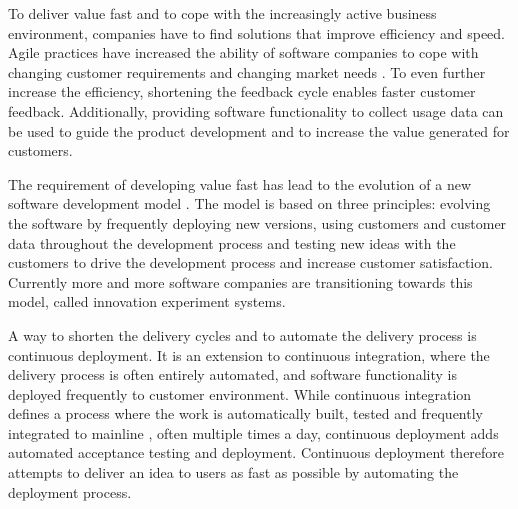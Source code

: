 \documentclass[english]{tktltiki2}
\theoremstyle{definition}
\theoremstyle{remark}
\begin{document}
To deliver value fast and to cope with the increasingly active business environment, companies have to find solutions that improve efficiency and speed. Agile practices \cite{cockburn2002agile} have increased the ability of software companies to cope with changing customer requirements and changing market needs \cite{dzamashvili2010impact}. To even further increase the efficiency, shortening the feedback cycle enables faster customer feedback. Additionally, providing software functionality to collect usage data can be used to guide the product development and to increase the value generated for customers. 

The requirement of developing value fast has lead to the evolution of a new software development model \cite{bosch2012building}. The model is based on three principles: evolving the software by frequently deploying new versions, using customers and customer data throughout the development process and testing new ideas with the customers to drive the development process and increase customer satisfaction. Currently more and more software companies are transitioning towards this model, called innovation experiment systems. 


A way to shorten the delivery cycles and to automate the delivery process is continuous deployment. It is an extension to continuous integration, where the delivery process is often entirely automated, and software functionality is deployed frequently to customer environment. While continuous integration defines a process where the work is automatically built, tested and frequently integrated to mainline \cite{fowler2006continuous}, often multiple times a day, continuous deployment adds automated acceptance testing and deployment. Continuous deployment therefore attempts to deliver an idea to users as fast as possible by automating the deployment process.
\end{document}
